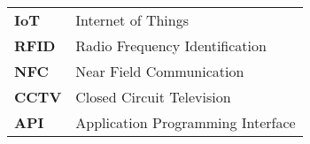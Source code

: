 \begin{viettat}
\renewcommand{\abstractname}{}

\begin{table}[H]
\label{my-label}
\begin{tabular}{ll}
\textbf{IoT}  & Internet of Things                \\
\textbf{RFID} & Radio Frequency Identification    \\
\textbf{NFC}  & Near Field Communication          \\
\textbf{CCTV} & Closed Circuit Television         \\
\textbf{API}  & Application Programming Interface
\end{tabular}
\end{table}

\end{viettat}
